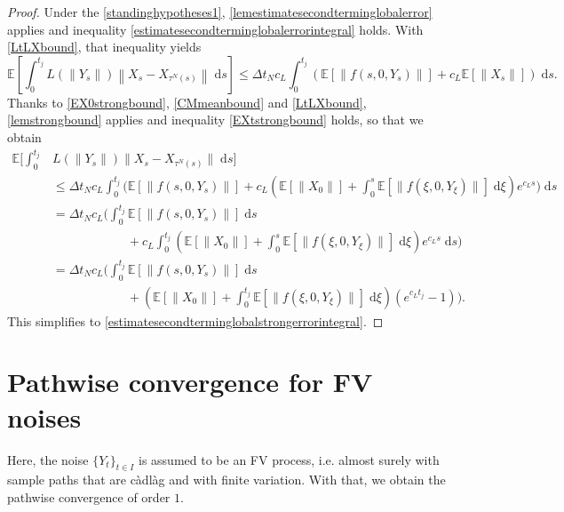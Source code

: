 \documentclass[reqno,12pt]{amsart}
\theoremstyle{plain} %
\theoremstyle{definition} %
\begin{document}
\begin{proof}    
    Under the \cref{standinghypotheses1}, \cref{lemestimatesecondterminglobalerror} applies and inequality \eqref{estimatesecondterminglobalerrorintegral} holds.
    With \eqref{LtLXbound}, that inequality yields
    \[
        \mathbb{E}\left[\int_0^{t_j}L(\|Y_s\|)\left\|X_s - X_{\tau^N(s)}\right\| \;\mathrm{d}s\right] \leq \Delta t_N c_L \int_0^{t_j} \left(\mathbb{E}\left[\|f(s, 0, Y_s)\|\right] + c_L\mathbb{E}\left[\|X_s\|\right]\right) \;\mathrm{d}s.
    \]
    Thanks to \eqref{EX0strongbound}, \eqref{CMmeanbound} and \eqref{LtLXbound}, \cref{lemstrongbound} applies and inequality \eqref{EXtstrongbound} holds, so that we obtain
    \begin{align*}
        \mathbb{E}\bigg[\int_0^{t_j} & L(\|Y_s\|) \|X_s - X_{\tau^N(s)}\| \;\mathrm{d}s\bigg] \\
        & \leq \Delta t_N c_L \int_0^{t_j} \bigg(\mathbb{E}[\|f(s, 0, Y_s)\|] + c_L\left(\mathbb{E}[\|X_0\|] + \int_0^s \mathbb{E}[\|f(\xi,0, Y_\xi)\|]\;\mathrm{d}\xi\right)e^{c_L s} \bigg)\;\mathrm{d}s \\
        & = \Delta t_N c_L \bigg(\int_0^{t_j} \mathbb{E}[\|f(s, 0, Y_s)\|] \;\mathrm{d}s \\
        & \hspace{1in} + c_L\int_0^{t_j}\left(\mathbb{E}[\|X_0\|] + \int_0^s \mathbb{E}[\|f(\xi, 0, Y_\xi)\|]\;\mathrm{d}\xi\right)e^{c_L s} \;\mathrm{d}s\bigg) \\
        & = \Delta t_N c_L \bigg(\int_0^{t_j} \mathbb{E}[\|f(s, 0, Y_s)\|] \;\mathrm{d}s \\
        & \hspace{1in} + \left(\mathbb{E}[\|X_0\|] + \int_0^{t_j} \mathbb{E}[\|f(\xi, 0, Y_\xi)\|]\;\mathrm{d}\xi\right)\left(e^{c_L t_j} - 1\right) \bigg).
    \end{align*}
    This simplifies to \eqref{estimatesecondterminglobalstrongerrorintegral}.
\end{proof}

\section{Pathwise convergence for FV noises}
\label{secmonotonicbound}

Here, the noise $\{Y_t\}_{t\in I}$ is assumed to be an FV process, i.e. almost surely with sample paths that are c\`adl\`ag and with finite variation. With that, we obtain the pathwise convergence of order $1.$
\end{document}
